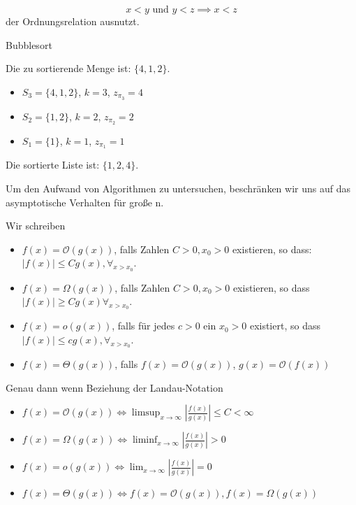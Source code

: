 \[
x<y \text{ und } y<z \implies x<z
\]
der Ordnungsrelation ausnutzt. \\
\begin{algorithm}[H]
\caption{Bubblesort}
\label{alg:bubblesort}
\end{algorithm}
\begin{example}
Die zu sortierende Menge ist: $\{4,1,2\}$.
\begin{itemize}
	\item $S_3=\{4,1,2\}$, $k=3$, $z_{\pi_3}=4$
	\item $S_2=\{1,2\}$, $k=2$, $z_{\pi_2}=2$
	\item $S_1=\{1\}$, $k=1$, $z_{\pi_1}=1$
\end{itemize}
Die sortierte Liste ist: $\{1,2,4\}$.
\end{example}
Um den Aufwand von Algorithmen zu untersuchen, beschränken wir uns auf das asymptotische Verhalten für große n.
\begin{definition}
Wir schreiben
\begin{itemize}
	\item $f(x)= \mathcal{O}(g(x))$, falls Zahlen $C>0, x_0>0$ existieren, so dass: $|f(x)|\le Cg(x), \forall_{x>x_0}$.
	\item $f(x)=\Omega(g(x))$, falls Zahlen $C>0, x_0>0$ existieren, so dass $|f(x)|\ge Cg(x) \forall_{x>x_0}$.
	\item $f(x)=o(g(x))$, falls für jedes $c>0$ ein $x_0>0$ existiert, so dass 
		$|f(x)|\le cg(x), \forall_{x>x_0}$.
	\item $f(x)= \Theta(g(x))$, falls $f(x)=\mathcal{O}(g(x))$, $g(x)= \mathcal{O}(f(x))$
\end{itemize}
\end{definition}
\begin{remark}
Genau dann wenn Beziehung der Landau-Notation
\begin{itemize}
	\item $f(x)=\mathcal{O}(g(x)) \iff \limsup_{x \to \infty} |\frac{f(x)}{g(x)}|\le C<\infty$
	\item $f(x)= \Omega(g(x)) \iff \liminf_{x \to \infty} |\frac{f(x)}{g(x)}|>0$
	\item $f(x)= o(g(x)) \iff \lim_{x \to \infty} |\frac{f(x)}{g(x)}| =0$
	\item $f(x)= \Theta(g(x)) \iff f(x)= \mathcal{O}(g(x)), f(x)= \Omega(g(x))$
\end{itemize}
\end{remark}
